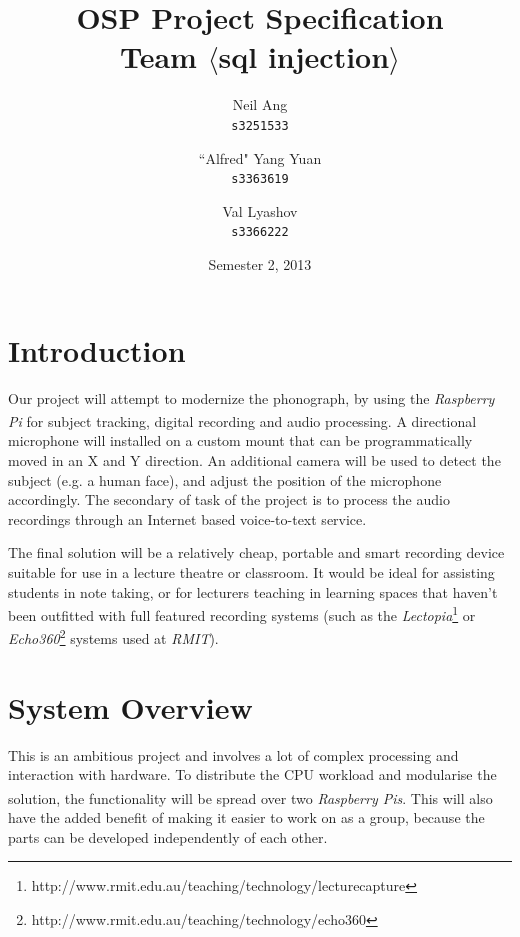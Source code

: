 \documentclass[11pt,a4paper,titlepage]{report}
\title{OSP Project Specification \\ Team $\langle$sql injection$\rangle$}
\author{
  Neil Ang\\
  \texttt{s3251533}
  \and
  ``Alfred" Yang Yuan\\
  \texttt{s3363619}
  \and
  Val Lyashov\\
  \texttt{s3366222}
}
\date{Semester 2, 2013}
\newcommand{\rpi}{\textit{Raspberry Pi\textsuperscript{\textregistered}}}
\newcommand{\rpis}{\textit{Raspberry Pi\textsuperscript{\textregistered}s}}
\begin{document}
\maketitle

\pagebreak
\tableofcontents
\thispagestyle{empty}
\pagebreak

\section{Introduction}

Our project will attempt to modernize the phonograph, by using the \rpi\xspace for subject tracking, digital recording and audio processing. A directional microphone will installed on a custom mount that can be programmatically moved in an X and Y direction. An additional camera will be used to detect the subject (e.g. a human face), and adjust the position of the microphone accordingly. The secondary of task of the project is to process the audio recordings through an Internet based voice-to-text service.

The final solution will be a relatively cheap, portable and smart recording device suitable for use in a lecture theatre or classroom. It would be ideal for assisting students in note taking, or for lecturers teaching in learning spaces that haven't been outfitted with full featured recording systems (such as the \textit{Lectopia}\footnote{http://www.rmit.edu.au/teaching/technology/lecturecapture} or \textit{Echo360}\footnote{http://www.rmit.edu.au/teaching/technology/echo360} systems used at \textit{RMIT}).


\section{System Overview}

This is an ambitious project and involves a lot of complex processing and interaction with hardware. To distribute the CPU workload and modularise the solution, the functionality will be spread over two \rpis. This will also have the added benefit of making it easier to work on as a group, because the parts can be developed independently of each other.
\end{document}
